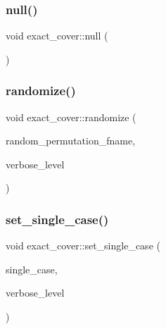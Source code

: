 \mbox{\label{classexact__cover_a88180f7d6fc5c4ac81b9b60f381dd39f}} 
\subsubsection{\texorpdfstring{null()}{null()}}
{\footnotesize\ttfamily void exact\+\_\+cover\+::null (\begin{DoxyParamCaption}{ }\end{DoxyParamCaption})}

\mbox{\label{classexact__cover_a6af91d1aa0f385822708da4bbd94480f}} 
\subsubsection{\texorpdfstring{randomize()}{randomize()}}
{\footnotesize\ttfamily void exact\+\_\+cover\+::randomize (\begin{DoxyParamCaption}\item[{const \mbox{\hyperlink{galois_8h_ab6cc7b4aeb6ea31aba2b3fbfc83ff5e6}{B\+Y\+TE}} $\ast$}]{random\+\_\+permutation\+\_\+fname,  }\item[{\mbox{\hyperlink{galois_8h_a09fddde158a3a20bd2dcadb609de11dc}{I\+NT}}}]{verbose\+\_\+level }\end{DoxyParamCaption})}

\mbox{\label{classexact__cover_a05a120970c25f87747313565db5950f5}} 
\subsubsection{\texorpdfstring{set\+\_\+single\+\_\+case()}{set\_single\_case()}}
{\footnotesize\ttfamily void exact\+\_\+cover\+::set\+\_\+single\+\_\+case (\begin{DoxyParamCaption}\item[{\mbox{\hyperlink{galois_8h_a09fddde158a3a20bd2dcadb609de11dc}{I\+NT}}}]{single\+\_\+case,  }\item[{\mbox{\hyperlink{galois_8h_a09fddde158a3a20bd2dcadb609de11dc}{I\+NT}}}]{verbose\+\_\+level }\end{DoxyParamCaption})}

